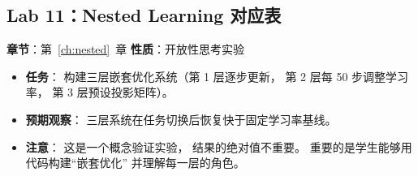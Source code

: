 \subsection{Lab 11：Nested Learning 对应表}

\textbf{章节}：第~\ref{ch:nested}~章 \quad
\textbf{性质}：开放性思考实验

\begin{itemize}
  \item \textbf{任务}：
    构建三层嵌套优化系统（第 1 层逐步更新，
    第 2 层每 50 步调整学习率，
    第 3 层预设投影矩阵）。

  \item \textbf{预期观察}：
    三层系统在任务切换后恢复快于固定学习率基线。

  \item \textbf{注意}：
    这是一个概念验证实验，
    结果的绝对值不重要。
    重要的是学生能够用代码构建``嵌套优化''
    并理解每一层的角色。
\end{itemize}
